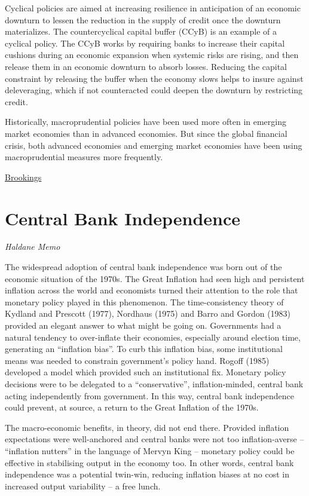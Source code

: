 \documentclass[
]{book}
\begin{document}
Cyclical policies are aimed at increasing resilience in anticipation of an economic downturn to lessen the reduction in the supply of credit once the downturn materializes. The countercyclical capital buffer (CCyB) is an example of a cyclical policy. The CCyB works by requiring banks to increase their capital cushions during an economic expansion when systemic risks are rising, and then release them in an economic downturn to absorb losses. Reducing the capital constraint by releasing the buffer when the economy slows helps to insure against deleveraging, which if not counteracted could deepen the downturn by restricting credit.

Historically, macroprudential policies have been used more often in emerging market economies than in advanced economies. But since the global financial crisis, both advanced economies and emerging market economies have been using macroprudential measures more frequently.

\href{https://www.brookings.edu/blog/up-front/2020/02/11/what-are-macroprudential-tools/}{Brookings}

\hypertarget{central-bank-independence-1}{%
\section{Central Bank Independence}\label{central-bank-independence-1}}

\emph{Haldane Memo}

The widespread adoption of central bank independence was born out of the economic situation of the 1970s. The Great Inflation had seen high and persistent inflation across the world and economists turned their attention to the role that monetary policy played in this phenomenon. The time-consistency theory of Kydland and Prescott (1977), Nordhaus (1975) and Barro and Gordon (1983) provided an elegant answer to what might be going on. Governments had a natural tendency to over-inflate their economies, especially around election time, generating an ``inflation bias''. To curb this inflation bias, some institutional means was needed to constrain government's policy hand. Rogoff (1985) developed a model which provided such an institutional fix. Monetary policy decisions were to be delegated to a ``conservative'', inflation-minded, central bank acting independently from government. In this way, central bank independence could prevent, at source, a return to the Great Inflation of the 1970s.

The macro-economic benefits, in theory, did not end there. Provided inflation expectations were well-anchored and central banks were not too inflation-averse -- ``inflation nutters'' in the language of Mervyn King -- monetary policy could be effective in stabilising output in the economy too. In other words, central bank independence was a potential twin-win, reducing inflation biases at no cost in increased output variability -- a free lunch.
\end{document}
